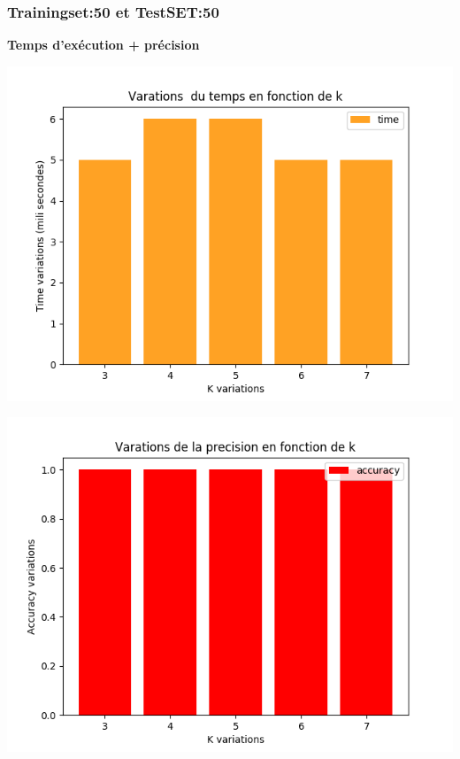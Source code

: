 \documentclass[12pt,a4paper,oneside]{book}
\begin{document}
	
	\subsubsection{Trainingset:50 et TestSET:50}
	
	\textbf{Temps d'exécution + précision}\\
	\begin{frame}{}
		\centering
		\begin{minipage}[b]{0.5\linewidth}
			\includegraphics[scale=0.5]{image/labor:Train,50,Test,50time.png}
			\label{labelname}%
		\end{minipage}
		\hspace{0.5cm}
		\begin{minipage}[b]{0.5\linewidth}
			\includegraphics[scale=0.5]{image/labor:Train,50,Test,50:accuracy.png}%
			\label{labelname}%
		\end{minipage}
	\end{frame}
	
\end{document}
